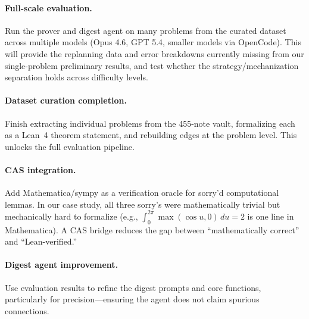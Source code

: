 \paragraph{Full-scale evaluation.} Run the prover and digest agent on many problems from the curated dataset across multiple models (Opus 4.6, GPT 5.4, smaller models via OpenCode). This will provide the replanning data and error breakdowns currently missing from our single-problem preliminary results, and test whether the strategy/mechanization separation holds across difficulty levels.

\paragraph{Dataset curation completion.} Finish extracting individual problems from the 455-note vault, formalizing each as a Lean~4 theorem statement, and rebuilding edges at the problem level. This unlocks the full evaluation pipeline.

\paragraph{CAS integration.} Add Mathematica/sympy as a verification oracle for sorry'd computational lemmas. In our case study, all three sorry's were mathematically trivial but mechanically hard to formalize (e.g., $\int_0^{2\pi} \max(\cos u, 0)\,du = 2$ is one line in Mathematica). A CAS bridge reduces the gap between ``mathematically correct'' and ``Lean-verified.''

\paragraph{Digest agent improvement.} Use evaluation results to refine the digest prompts and core functions, particularly for precision---ensuring the agent does not claim spurious connections.
